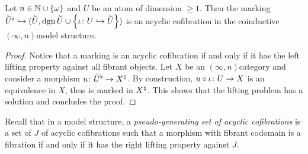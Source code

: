 \begin{lem} \label{lem:marked_localisation_acyclic}
    Let \( n \in \mathbb{N} \cup \left\{ {\omega} \right\} \) and \( U \) be an atom of dimension \( \geq 1 \).
    Then the marking \( {\widetilde{U}}^{\flat} \hookrightarrow (\widetilde{U}, \operatorname{dgn} \widetilde{U} \cup \left\{ {\iota \colon U \hookrightarrow \widetilde{U}} \right\}) \) is an acyclic cofibration in the coinductive \( (\infty, n) \)\nbd model structure.
\end{lem}
\begin{proof}
    Notice that a marking is an acyclic cofibration if and only if it has the left lifting property against all fibrant objects.
    Let \( X \) be an \( (\infty, n) \)\nbd category and consider a morphism \( u \colon {\widetilde{U}}^{\flat} \to {X}^{\natural} \).
    By construction, \( u \circ \iota \colon U \to X \) is an equivalence in \( X \), thus is marked in \( {X}^{\natural} \).
    This shows that the lifting problem has a solution and concludes the proof.
\end{proof}

\noindent Recall that in a model structure, a \emph{pseudo-generating set of acyclic cofibrations} is a set of \( J \) of acyclic cofibrations such that a morphism with fibrant codomain is a fibration if and only if it has the right lifting property against \( J \).

